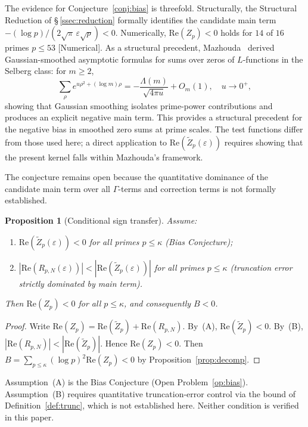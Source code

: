 \documentclass[11pt]{article}
\newtheorem{proposition}[theorem]{Proposition}
\newcommand{\Zt}{\widetilde{Z}}
\begin{document}
The evidence for Conjecture~\ref{conj:bias} is threefold.
Structurally, the Structural Reduction of \S\,\ref{ssec:reduction}
formally identifies the candidate main term
$-(\log p)/(2\sqrt{\pi}\,\varepsilon\sqrt{p})<0$.
Numerically, $\mathrm{Re}(Z_p)<0$ holds for $14$ of $16$ primes
$p\leq 53$ [Numerical].
As a structural precedent, Mazhouda~\cite{Mazhouda} derived
Gaussian-smoothed asymptotic formulas for sums over zeros of
$L$-functions in the Selberg class: for $m\geq 2$,
\[
\sum_\rho e^{u\rho^2+(\log m)\rho}
  = -\frac{\Lambda(m)}{\sqrt{4\pi u}} + O_m(1), \quad u\to 0^+,
\]
showing that Gaussian smoothing isolates prime-power contributions
and produces an explicit negative main term.
This provides a structural precedent for the negative bias in smoothed
zero sums at prime scales.
The test functions differ from those used here; a direct application
to $\mathrm{Re}(\Zt_p(\varepsilon))$ requires showing that the present
kernel falls within Mazhouda's framework.

The conjecture remains open because the quantitative dominance of the
candidate main term over all $\Gamma$-terms and correction terms is
not formally established.

\begin{proposition}[Conditional sign transfer]
\label{prop:sign}
Assume:
\begin{enumerate}[label=\textup{(\Alph*)}]
\item $\mathrm{Re}(\Zt_p(\varepsilon))<0$ for all primes $p\leq\kappa$
  \textup{(Bias Conjecture)};
\item $|\mathrm{Re}(R_{p,N}(\varepsilon))|<|\mathrm{Re}(\Zt_p(\varepsilon))|$
  for all primes $p\leq\kappa$
  \textup{(truncation error strictly dominated by main term)}.
\end{enumerate}
Then $\mathrm{Re}(Z_p)<0$ for all $p\leq\kappa$,
and consequently $B<0$.
\end{proposition}

\begin{proof}
Write $\mathrm{Re}(Z_p) = \mathrm{Re}(\Zt_p) + \mathrm{Re}(R_{p,N})$.
By~(A), $\mathrm{Re}(\Zt_p)<0$.
By~(B), $|\mathrm{Re}(R_{p,N})|<|\mathrm{Re}(\Zt_p)|$.
Hence $\mathrm{Re}(Z_p)<0$.
Then $B=\sum_{p\leq\kappa}(\log p)^2\mathrm{Re}(Z_p)<0$
by Proposition~\ref{prop:decomp}.
\end{proof}

Assumption~(A) is the Bias Conjecture (Open Problem~\ref{op:bias}).
Assumption~(B) requires quantitative truncation-error control via
the bound of Definition~\ref{def:trunc}, which is not established here.
Neither condition is verified in this paper.
\end{document}

